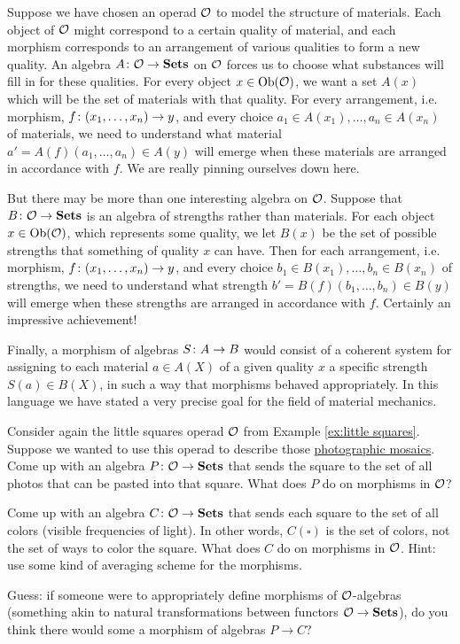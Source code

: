 \begin{application}
\end{application}

\begin{application}

Suppose we have chosen an operad $\mathcal{O}$ to model the structure of materials. Each object of $\mathcal{O}$ might correspond to a certain quality of material, and each morphism corresponds to an arrangement of various qualities to form a new quality. An algebra $A\colon\mathcal{O}\rightarrow{\bf Sets}$ on $\mathcal{O}$ forces us to choose what substances will fill in for these qualities. For every object $x\in\textnormal{Ob}(\mathcal{O})$, we want a set $A(x)$ which will be the set of materials with that quality. For every arrangement, i.e. morphism, $f\colon (x_1,\ldots,x_n)\rightarrow y$, and every choice $a_1\in A(x_1), \ldots, a_n\in A(x_n)$ of materials, we need to understand what material $a'=A(f)(a_1,\ldots,a_n)\in A(y)$ will emerge when these materials are arranged in accordance with $f$. We are really pinning ourselves down here.

But there may be more than one interesting algebra on $\mathcal{O}$. Suppose that $B\colon\mathcal{O}\rightarrow{\bf Sets}$ is an algebra of strengths rather than materials. For each object $x\in\textnormal{Ob}(\mathcal{O})$, which represents some quality, we let $B(x)$ be the set of possible strengths that something of quality $x$ can have. Then for each arrangement, i.e. morphism, $f\colon (x_1,\ldots,x_n)\rightarrow y$, and every choice $b_1\in B(x_1), \ldots, b_n\in B(x_n)$ of strengths, we need to understand what strength $b'=B(f)(b_1,\ldots,b_n)\in B(y)$ will emerge when these strengths are arranged in accordance with $f$. Certainly an impressive achievement!

Finally, a morphism of algebras $S\colon A\rightarrow B$ would consist of a coherent system for assigning to each material $a\in A(X)$ of a given quality $x$ a specific strength $S(a)\in B(X)$, in such a way that morphisms behaved appropriately. In this language we have stated a very precise goal for the field of material mechanics.

\end{application}

\begin{exercise}
Consider again the little squares operad $\mathcal{O}$ from Example \ref{ex:little squares}. Suppose we wanted to use this operad to describe those \href{http://en.wikipedia.org/wiki/Photographic_mosaic}{\text photographic mosaics}. 
\sexc Come up with an algebra $P\colon\mathcal{O}\rightarrow{\bf Sets}$ that sends the square to the set of all photos that can be pasted into that square. What does $P$ do on morphisms in $\mathcal{O}$?
\item Come up with an algebra $C\colon\mathcal{O}\rightarrow{\bf Sets}$ that sends each square to the set of all colors (visible frequencies of light). In other words, $C(\square)$ is the set of colors, not the set of ways to color the square. What does $C$ do on morphisms in $\mathcal{O}$. Hint: use some kind of averaging scheme for the morphisms.
\item Guess: if someone were to appropriately define morphisms of $\mathcal{O}$-algebras (something akin to natural transformations between functors $\mathcal{O}\rightarrow{\bf Sets}$), do you think there would some a morphism of algebras $P\to C$?
\endsexc
\end{exercise}

